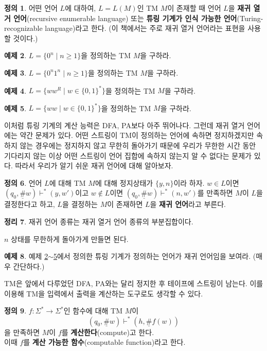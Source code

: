 \documentclass[b5paper, 10pt]{book}
\theoremstyle{definition}
\newtheorem{defn}{정의}[chapter]
\newtheorem{thm}[defn]{정리}
\newtheorem{ex}[defn]{예제}
\newenvironment{pf*}{\pushQED{\qed}\pf}{\popQED\endpf}
\begin{document}
\begin{defn}
    어떤 언어 $L$에 대하여, $L = L(M)$인 TM $M$이 존재할 때 언어 $L$을 
    \textbf{재귀 열거 언어}(recursive enumerable language) 또는 
    \textbf{튜링 기계가 인식 가능한 언어}(Turing-recognizable language)라고 한다. (이 책에서는 주로
    재귀 열거 언어라는 표현을 사용할 것이다.)
\end{defn}
\begin{ex}
    \label{tm ex1}
    $L = \{0^n \;\vert\; n \ge 1\}$을 정의하는 TM $M$을 구하라.
\end{ex}
\begin{ex}
    $L = \{0^n1^n \;\vert\; n \ge 1\}$을 정의하는 TM $M$을 구하라.
\end{ex}
\begin{ex}
    $L = \{w w^R \;\vert\; w \in \{0,1\}^*\}$을 정의하는 TM $M$을 구하라.
\end{ex}
\begin{ex}
    \label{tm ex4}
    $L = \{ww \;\vert\; w \in \{0,1\}^*\}$을 정의하는 TM $M$을 구하라.
\end{ex}
이처럼 튜링 기계의 계산 능력은 DFA, PA보다 아주 뛰어나다. 그런데 재귀 열거 언어에는 약간 문제가 있다.
어떤 스트링이 TM이 정의하는 언어에 속하면 정지하겠지만 속하지 않는 경우에는
정지하지 않고 무한히 돌아가기 때문에 우리가 무한한 시간 동안 기다리지 않는 이상 
어떤 스트링이 언어 집합에 속하지 않는지 알 수 없다는 문제가 있다. 따라서 우리가 알기 쉬운 재귀 언어에 
대해 알아보자.
\begin{defn}
    언어 $L$에 대해 TM $M$에 대해 정지상태가 $\{y,n\}$이라 하자.
    $w \in L$이면 $(q_0, \underline{\#}w) \vdash^* (y, w')$이고 
    $w \notin L$이면 $(q_0, \underline{\#}w) \vdash^* (n, w')$를 만족하면 $M$이 $L$을 결정한다고 하고, 
    $L$을 결정하는 $M$이 존재하면 $L$을 \textbf{재귀 언어}라고 부른다.
\end{defn}
\begin{thm}
    재귀 언어 종류는 재귀 열거 언어 종류의 부분집합이다.
\end{thm}
\begin{pf*}
    $n$ 상태를 무한하게 돌아가게 만들면 된다.
\end{pf*}
\begin{ex}
    예제 \ref{tm ex1}$\sim$\ref{tm ex4}에서 정의한 튜링 기계가 정의하는 언어가 재귀 언어임을 보여라. (매우 간단하다.)
\end{ex}
TM은 앞에서 다루었던 DFA, PA와는 달리 정지한 후 테이프에 스트링이 남는다.
이를 이용해 TM을 입력에서 출력을 계산하는 도구로도 생각할 수 있다.
\begin{defn}
    $f: \Sigma^* \rightarrow \Sigma^*$인 함수에 대해 TM $M$이
    $$(q_0, \underline{\#}w) \vdash^* (h, \underline{\#}f(w))$$
    을 만족하면 $M$이 $f$를 \textbf{계산한다}(compute)고 한다. \\ 이때 $f$를
    \textbf{계산 가능한 함수}(computable function)라고 한다. 
\end{defn}
\end{document}
